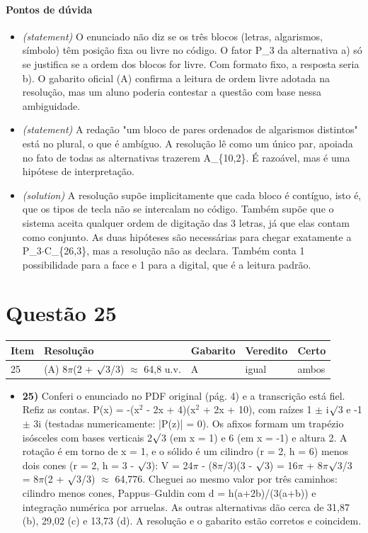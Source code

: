 \documentclass{article}%
\begin{document}
\paragraph{Pontos de dúvida}%
\begin{itemize}%
\item%
\textit{(statement)} O enunciado não diz se os três blocos (letras, algarismos, símbolo) têm posição fixa ou livre no código. O fator P\_3 da alternativa a) só se justifica se a ordem dos blocos for livre. Com formato fixo, a resposta seria b). O gabarito oficial (A) confirma a leitura de ordem livre adotada na resolução, mas um aluno poderia contestar a questão com base nessa ambiguidade.%
\item%
\textit{(statement)} A redação "um bloco de pares ordenados de algarismos distintos" está no plural, o que é ambíguo. A resolução lê como um único par, apoiada no fato de todas as alternativas trazerem A\_\{10,2\}. É razoável, mas é uma hipótese de interpretação.%
\item%
\textit{(solution)} A resolução supõe implicitamente que cada bloco é contíguo, isto é, que os tipos de tecla não se intercalam no código. Também supõe que o sistema aceita qualquer ordem de digitação das 3 letras, já que elas contam como conjunto. As duas hipóteses são necessárias para chegar exatamente a P\_3$\cdot$C\_\{26,3\}, mas a resolução não as declara. Também conta 1 possibilidade para a face e 1 para a digital, que é a leitura padrão.%
\end{itemize}%
\section*{Questão 25}%
\begin{longtable}{@{}p{} p{} p{} p{} p{}@{}}\toprule Item & Resolução & Gabarito & Veredito & Certo \\ \midrule
25 & (A) 8$\pi$(2 + $\surd$3/3) $\approx$ 64,8 u.v. & A & igual & ambos \\
\bottomrule\end{longtable}%
\begin{itemize}%
\item%
\textbf{25)} Conferi o enunciado no PDF original (pág. 4) e a transcrição está fiel. Refiz as contas. P(x) = -(x$^2$ - 2x + 4)(x$^2$ + 2x + 10), com raízes 1 $\pm$ i$\surd$3 e -1 $\pm$ 3i (testadas numericamente: |P(z)| = 0). Os afixos formam um trapézio isósceles com bases verticais 2$\surd$3 (em x = 1) e 6 (em x = -1) e altura 2. A rotação é em torno de x = 1, e o sólido é um cilindro (r = 2, h = 6) menos dois cones (r = 2, h = 3 - $\surd$3): V = 24$\pi$ - (8$\pi$/3)(3 - $\surd$3) = 16$\pi$ + 8$\pi$$\surd$3/3 = 8$\pi$(2 + $\surd$3/3) $\approx$ 64,776. Cheguei ao mesmo valor por três caminhos: cilindro menos cones, Pappus--Guldin com d = h(a+2b)/(3(a+b)) e integração numérica por arruelas. As outras alternativas dão cerca de 31,87 (b), 29,02 (c) e 13,73 (d). A resolução e o gabarito estão corretos e coincidem.%
\end{itemize}%
\end{document}
